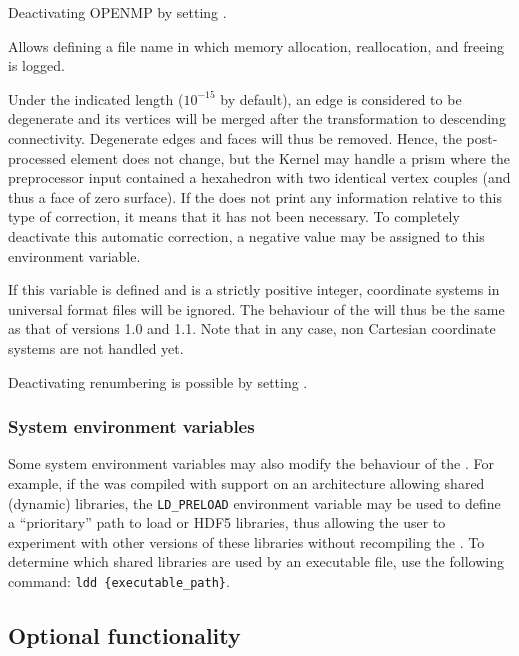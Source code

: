{{{{Deactivating OPENMP by setting .


Allows defining a file name in which memory allocation, reallocation,
and freeing is logged.


Under the indicated length ($10^{-15}$ by default), an edge is considered
to be degenerate and its vertices will be merged after the transformation
to descending connectivity. Degenerate edges and faces will thus be
removed. Hence, the post-processed element does not change, but the
Kernel may handle a prism where the preprocessor input contained a
hexahedron with two identical vertex couples (and thus a face of zero
surface). If the \pcs does not print any information relative to this
type of correction, it means that it has not been necessary. To completely
deactivate this automatic correction, a negative value may be assigned
to this environment variable.


If this variable is defined and is a strictly positive integer, coordinate
systems in \ideas universal format files will be ignored. The behaviour
of the \pcs will thus be the same as that of versions 1.0 and 1.1.
Note that in any case, non Cartesian coordinate systems are not handled yet.


Deactivating renumbering is possible by setting .


\subsubsection{System environment variables\label{sec:envpcs:sys}}

Some system environment variables may also modify the behaviour of
the \pcs. For example, if the \pcs was compiled with \med support
on an architecture allowing shared (dynamic) libraries, the
\texttt {LD\_PRELOAD} environment variable may be used to define a
``prioritary'' path to load \med or HDF5 libraries, thus allowing the user to experiment
with other versions of these libraries without recompiling the \pcs.
To determine which shared libraries are used by an executable file, use
the following command: \texttt{ldd~\{executable\_path\}}.

\subsection{Optional functionality\label{sec:pcs:lib_opt}}

}}}}
